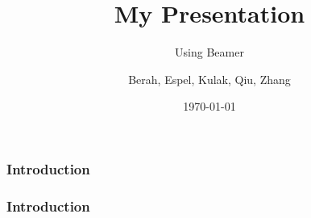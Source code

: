 \documentclass{beamer}
\title{My Presentation}
\subtitle{Using Beamer}
\author{Berah, Espel, Kulak, Qiu, Zhang}
\institute{Imperial College London}
\date{\today}
\begin{document}
\begin{frame}
    \frametitle{Introduction}
    \titlepage
\end{frame}

\begin{frame}
\frametitle{Introduction}
\end{frame}
\end{document}

